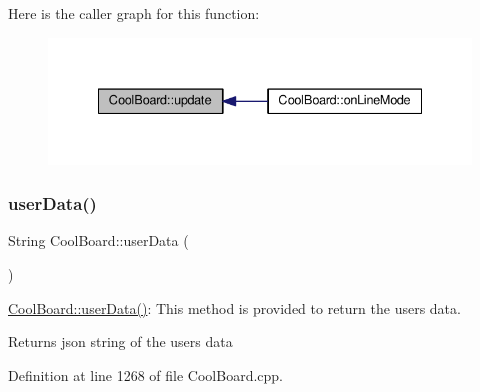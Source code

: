 Here is the caller graph for this function\+:\nopagebreak
\begin{figure}[H]
\begin{center}
\leavevmode
\includegraphics[width=335pt]{d7/df9/class_cool_board_a8612756d3f73198cdde857a66f0fe690_icgraph}
\end{center}
\end{figure}
\mbox{\label{class_cool_board_ae7358fb6e623cfc81b775f5f1734909b}} 
\subsubsection{\texorpdfstring{user\+Data()}{userData()}}
{\footnotesize\ttfamily String Cool\+Board\+::user\+Data (\begin{DoxyParamCaption}{ }\end{DoxyParamCaption})}

\hyperlink{class_cool_board_ae7358fb6e623cfc81b775f5f1734909b}{Cool\+Board\+::user\+Data()}\+: This method is provided to return the user\textquotesingle{}s data.

\begin{DoxyReturn}{Returns}
json string of the user\textquotesingle{}s data 
\end{DoxyReturn}


Definition at line 1268 of file Cool\+Board.\+cpp.


